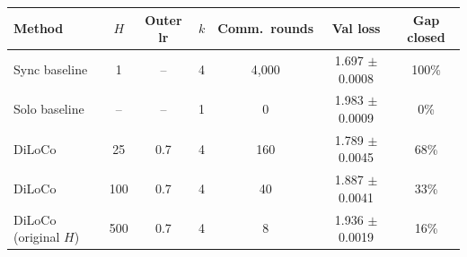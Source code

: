 \begin{tabular}{lcccccc}
\toprule
Method & $H$ & Outer lr & $k$ & Comm.\ rounds & Val loss & Gap closed \\
\midrule
Sync baseline & 1 & -- & 4 & 4{,}000 & 1.697 $\pm$ 0.0008 & 100\% \\
Solo baseline & -- & -- & 1 & 0 & 1.983 $\pm$ 0.0009 & 0\% \\
DiLoCo & 25 & 0.7 & 4 & 160 & 1.789 $\pm$ 0.0045 & 68\% \\
DiLoCo & 100 & 0.7 & 4 & 40 & 1.887 $\pm$ 0.0041 & 33\% \\
DiLoCo (original $H$) & 500 & 0.7 & 4 & 8 & 1.936 $\pm$ 0.0019 & 16\% \\
\bottomrule
\end{tabular}
